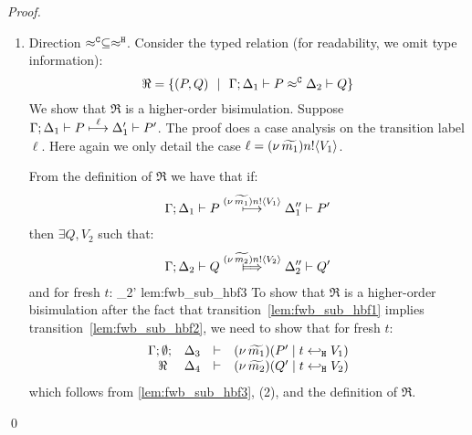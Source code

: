 \begin{proof}
\begin{enumerate}[1.]

		\item	Direction $\approx^\mathtt{C} \subseteq \approx^\mathtt{H}$.
				\noi Consider the typed relation (for readability, we omit type information):
				\[
					\Re = \{
								(P, Q) 
								\ \ |\ \ 
								\Gamma; \Delta_1 \vdash P \approx^\mathtt{C} \Delta_2 \vdash Q\}
				\]
				We show that $\Re$ is a higher-order bisimulation.
				Suppose
				$
						\Gamma; \Delta_1 \vdash P \stackrel{ \ell}{\longmapsto} \Delta_1' \vdash P'
				$.
				The proof does a case analysis on the transition label $\ell$.
				Here again we only detail the case $\ell = (\nu\, \widetilde{m_1}) n ! \langle V_1 \rangle$.
				
				\smallskip

							\noi From the definition of $\Re$ we have that if:
							\begin{eqnarray}
								\Gamma; \Delta_1 \vdash P \stackrel{(\nu\, \widetilde{m_1}) n ! \langle V_1 \rangle}{\longmapsto} \Delta_1'' \vdash P'
								\label{lem:fwb_sub_hbf1}
							\end{eqnarray}
							then $\exists Q, V_2$ such that:
							\begin{eqnarray}
								\horel{\Gamma}{\Delta_2}{Q}{\Hby{\news{\widetilde{m_2}} \bactout{n}{V_2}}}{\Delta_2''}{Q'}
								\label{lem:fwb_sub_hbf2}
							\end{eqnarray}
							and for fresh $t$:
								{\fwb}
								{\Delta_2'}{}
								{lem:fwb_sub_hbf3}
							\noi 
							To show that $\Re$ is a higher-order bisimulation
							after the fact that transition~\eqref{lem:fwb_sub_hbf1} implies transition~\eqref{lem:fwb_sub_hbf2},
							we need to show that for fresh $t$:
							\begin{eqnarray}
								\begin{array}{rcll} \Gamma; \emptyset; &\Delta_3& \vdash& (\nu\, \widetilde{m_1})(P' \;|\; t \hookleftarrow_{\mathtt{H}} V_1)\\ \ \Re\  &\Delta_4& \vdash &  (\nu\, \widetilde{m_2})(Q' \;|\; t \hookleftarrow_{\mathtt{H}} V_2) \end{array}
								\label{lem:fwb_sub_hbf4}
							\end{eqnarray}
							which follows from \eqref{lem:fwb_sub_hbf3}, (2),
							and the definition of $\Re$.

	\end{enumerate}
	\qed
\end{proof}


